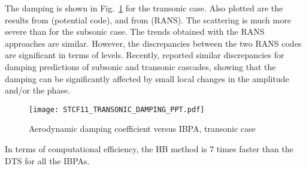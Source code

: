 The damping is shown in Fig.~\ref{fig:stcf11_transonic_damping} for
the transonic case. Also plotted are the results from
\citet{Fransson1999} (potential code), and 
from \citet{Cinnella2004} (RANS). The scattering is much more severe
than for the subsonic case. The trends obtained with the RANS approaches are similar. However, the
discrepancies between the two RANS codes are significant in terms of
levels.
Recently, \citet{Vogt2011} reported similar discrepancies 
for damping predictions of subsonic and transonic cascades, 
showing that the damping can be significantly affected by 
small local changes in the amplitude and/or the phase.
\begin{figure}[htb]
  \centering
  \texttt{[image: STCF11\_TRANSONIC\_DAMPING\_PPT.pdf]}
  \caption{Aerodynamic damping coefficient versus IBPA, transonic case}
  \label{fig:stcf11_transonic_damping}
\end{figure}
In terms of computational efficiency, the HB method is 7 times faster
than the DTS  for all the IBPAs.